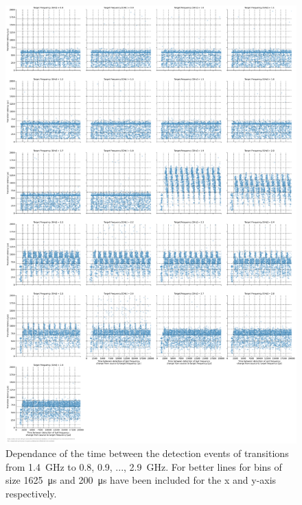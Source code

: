 \begin{figure}[]
    \centering
    \includegraphics[width=\columnwidth]{fig/ftalat/ftalat_scatter_wait_transition_latency_hati_source_1.4.pdf}
    \caption{Dependance of the time between the detection events of transitions from \SI{1.4}{\GHz} to \SI{0.8}{}, \SI{0.9}{}, ..., \SI{2.9}{\GHz}. For better lines for bins of size \SI{1625}{\us} and \SI{200}{\us} have been included for the x and y-axis respectively.}
\end{figure}
